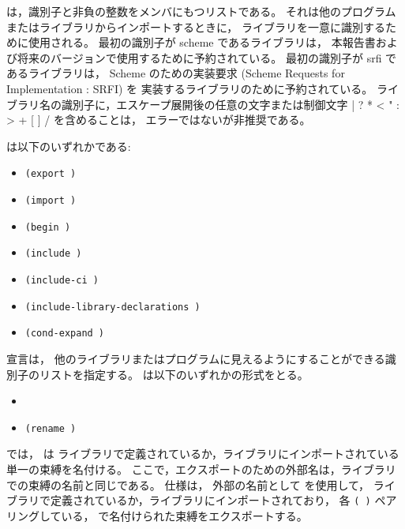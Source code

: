  は，識別子と非負の整数をメンバにもつリストである。
それは他のプログラムまたはライブラリからインポートするときに，
ライブラリを一意に識別するために使用される。
最初の識別子が {\cf scheme} であるライブラリは，
本報告書および将来のバージョンで使用するために予約されている。
最初の識別子が {\cf srfi} であるライブラリは，
Scheme のための実装要求 (Scheme Requests for Implementation : SRFI) を
実装するライブラリのために予約されている。
ライブラリ名の識別子に，エスケープ展開後の任意の文字または制御文字
{\cf | \backwhack{} ? * < " : > + [ ] /} を含めることは，
エラーではないが非推奨である。

\label{librarydeclarations}
 は以下のいずれかである:

\begin{itemize}

\item{\tt(export  \dotsfoo)}

\item{\tt(import  \dotsfoo)}

\item{\tt(begin  \dotsfoo)}

\item{\tt(include   \dotsfoo)}

\item{\tt(include-ci   \dotsfoo)}

\item{\tt(include-library-declarations   \dotsfoo)}

\item{\tt(cond-expand   \dotsfoo)}

\end{itemize}

 宣言は，
他のライブラリまたはプログラムに見えるようにすることができる識別子のリストを指定する。
 は以下のいずれかの形式をとる。

\begin{itemize}
\item{}
\item{\tt{(rename  )}}
\end{itemize}

 では， は
ライブラリで定義されているか，ライブラリにインポートされている単一の束縛を名付ける。
ここで，エクスポートのための外部名は，ライブラリでの束縛の名前と同じである。
 仕様は，
外部の名前として  を使用して，
ライブラリで定義されているか，ライブラリにインポートされており，
各 {\tt( )} ペアリングしている，
 で名付けられた束縛をエクスポートする。

